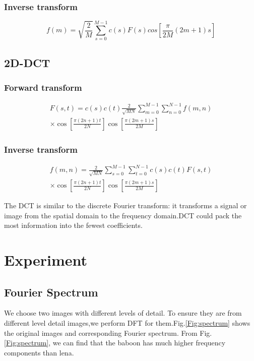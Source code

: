 \documentclass[journal,comsoc]{IEEEtran}
\begin{document}
\subsubsection{Inverse transform}
\label{subsubsec:1d-idct-transform}

\begin{equation}
  \label{equ:1d-idct}
  f(m)=\sqrt{\frac{2}{M}}\sum_{s=0}^{M-1}c(s)F(s)cos[\frac{\pi}{2M}(2m+1)s]
\end{equation}

\subsection{2D-DCT}
\label{subsec:2d-dct}

\subsubsection{Forward transform}
\label{subsubsec:2d-dct-forward-transform}


\begin{eqnarray}
  \label{equ:2d-dct-forward-transform}
  F(s,t)=c(s)c(t)\frac{2}{\sqrt{MN}}\sum_{m=0}^{M-1}\sum_{n=0}^{N-1}f(m,n)\nonumber\\
  \times\cos{[\frac{\pi(2n+1)t}{2N}]}\cos{[\frac{\pi(2m+1)s}{2M}]}
\end{eqnarray}

\subsubsection{Inverse transform}
\label{subsubsec:2d-idct-forward-transform}

\begin{eqnarray}
  \label{equ:2d-idct-forward-transform}
  f(m,n)=\frac{2}{\sqrt{MN}}\sum_{s=0}^{M-1}\sum_{t=0}^{N-1}c(s)c(t)F(s,t)\nonumber\\
  \times\cos{[\frac{\pi(2n+1)t}{2N}]}\cos{[\frac{\pi(2m+1)s}{2M}]}
\end{eqnarray}

The DCT is similar to the discrete Fourier transform: it transforms a signal or
image from the spatial domain to the frequency domain.DCT could pack the most
information into the fewest coefficients.

\section{Experiment}
\label{sec:label}

\subsection{Fourier Spectrum}
\label{subsec:sub-fourier-spectrum}
We choose two images with different levels of detail. To ensure they are from different level
detail images,we perform DFT for them.Fig.\ref{Fig:spectrum} shows the original images and corresponding
Fourier spectrum.
From Fig.\ref{Fig:spectrum}, we can find that the baboon has much higher frequency components than lena.
\end{document}
